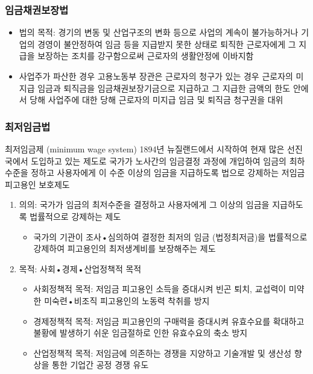 \documentclass[aspectratio=169,xcolor=dvipsnames,handout]{beamer}
\begin{document}
\begin{frame}
    \frametitle{임금채권보장법}
    \begin{itemize}[<+->]
        \item 법의 목적: 경기의 변동 및 산업구조의 변화 등으로 사업의 계속이 불가능하거나 기업의 경영이 불안정하여 임금 등을 지급받지 못한 상태로 퇴직한 근로자에게 그 지급을 보장하는 조치를 강구함으로써 근로자의 생활안정에 이바지함
        \item 사업주가 파산한 경우 고용노동부 장관은 근로자의 청구가 있는 경우 근로자의 미지급 임금과 퇴직금을 임금채권보장기금으로 지급하고 그 지급한 금액의 한도 안에서 당해 사업주에 대한 당해 근로자의 미지급 임금 및 퇴직금 청구권을 대위
    \end{itemize}
\end{frame}

\begin{frame}[allowframebreaks]
    \frametitle{최저임금법}
    \begin{block}{최저임금제 (minimum wage system)}
        1894년 뉴질랜드에서 시작하여 현재 많은 선진국에서 도입하고 있는 제도로 국가가 노사간의 임금결정 과정에 개입하여 임금의 최하수준을 정하고 사용자에게 이 수준 이상의 임금을 지급하도록 법으로 강제하는 저임금 피고용인 보호제도
    \end{block}
    \begin{enumerate}[<+->]
        \item 의의: 국가가 임금의 최저수준을 결정하고 사용자에게 그 이상의 임금을 지급하도록 법률적으로 강제하는 제도
        \begin{itemize}[<+->]
            \item 국가의 기관이 조사•심의하여 결정한 최저의 임금 (법정최저금)을 법률적으로 강제하여 피고용인의 최저생계비를 보장해주는 제도
        \end{itemize}
        \framebreak%
        \item 목적: 사회•경제•산업정책적 목적
        \begin{itemize}[<+->]
            \item 사회정책적 목적: 저임금 피고용인 소득을 증대시켜 빈곤 퇴치, 교섭력이 미약한 미숙련•비조직 피고용인의 노동력 착취를 방지
            \item 경제정책적 목적: 저임금 피고용인의 구매력을 증대시켜 유효수요를 확대하고 불황에 발생하기 쉬운 임금절하로 인한 유효수요의 축소 방지
            \item 산업정책적 목적: 저임금에 의존하는 경쟁을 지양하고 기술개발 및 생산성 향상을 통한 기업간 공정 경쟁 유도 
        \end{itemize}

\end{enumerate}
\end{frame}
\end{document}
